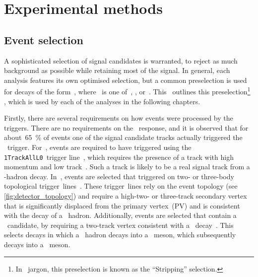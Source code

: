 \chapter{Experimental methods}
\label{chp:methods}

\vspace*{\fill}
\minitoc

\clearpage
\section{Event selection}
\label{sec:stripping}

A sophisticated selection of signal candidates is warranted, to reject as much background as possible while retaining most of the signal.
In general, each analysis features its own optimised selection, but a common preselection is used for decays of the form~\decay{\BorBsz}{\DorDsmp\hpm}, where \hpm~is one of~\pipm, \Kpm, or~\porpbar.
This~ outlines this preselection\footnote{
    In \lhcb~jargon, this preselection is known as the ``Stripping'' selection.}
, which is used by each of the analyses in the following chapters.

Firstly, there are several requirements on how events were processed by the triggers.
There are no requirements on the \lzero~response, and it is observed that for about~\SI{65}{\percent} of events one of the signal candidate tracks actually triggered the \lzero~trigger.
For~\hltone, events are required to have triggered using the \texttt{1TrackAllL0}~trigger line~\cite{Gligorov:1300771}, which requires the presence of a track with high momentum and low track~\chisqndf.
Such a track is likely to be a real signal track from a \bquark-hadron decay.
In~\hlttwo, events are selected that triggered on two- or three-body topological trigger~lines~\cite{hlt2toponote}.
These trigger~lines rely on the event topology (see \cref{fig:detector_topology}) and require a high-\pt two- or three-track secondary vertex that is significantly displaced from the primary vertex~(PV) and is consistent with the decay of a \bquark~hadron.
Additionally, events are selected that contain a \phiz~candidate, by requiring a two-track vertex consistent with a \PhiKK~decay~\cite{Gligorov:1362426}.
This selects decays in which a \bquark~hadron decays into a \Dsmp~meson, which subsequently decays into a \phiz~meson.

